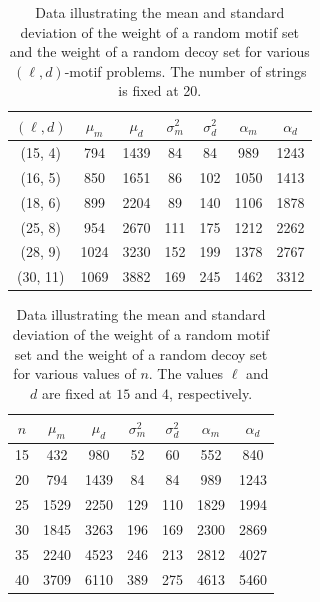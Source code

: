 \begin{table}[h!]
  \begin{center}
	\begin{tabular}{|c|c|c|c|c|c|c|}
\hline	
$(\ell, d)$& $\mu_m$ & $\mu_d$ & $\sigma_m^2$ & $\sigma_d^2$ & $\alpha_m$ & $\alpha_d$ \\
\hline
\hline
(15, 4)	& 794  		& 1439 	& 84    		& 84    		& 989 		& 1243		 \\
(16, 5) 	& 850 		& 1651 	& 86    		& 102  		& 1050 	& 1413		\\
(18, 6) 	& 899 		& 2204 	& 89    		& 140		& 1106 	& 1878 	 \\
(25, 8)	& 954 		& 2670 	& 111   	& 175  		& 1212 	& 2262		\\
(28, 9)	& 1024 	& 3230 	& 152   	& 199 		& 1378		& 2767		\\
(30, 11)& 1069 	& 3882 	& 169   	& 245 		& 1462		& 3312		 \\
	\hline
	\end{tabular} 
\caption[Data illustrating the mean and standard deviation of the weight of a random motif set and the weight of a random decoy set for various $(\ell, d)$-motif problems.]{Data illustrating the mean and standard deviation of the weight of a random motif set and the weight of a random decoy set for various $(\ell, d)$-motif problems.  The number of strings is fixed at 20.}
\label{chapter6:table3}
\end{center}
\end{table}


\begin{table}[h!]
  \begin{center}
	\begin{tabular}{|c|c|c|c|c|c|c|}
\hline	
$n$ & $\mu_m$ & $\mu_d$ & $\sigma_m^2$ & $\sigma_d^2$ & $\alpha_m$ & $\alpha_d$ \\
\hline
\hline
15 	& 432  	& 980 		& 52  		& 60    	& 552   	& 840  \\
20 	& 794  	& 1439 	& 84  		& 84    	& 989  		& 1243	\\
25 	& 1529 & 2250 	& 129 		& 110	& 1829		& 1994 \\
30 	& 1845 & 3263 	& 196 		& 169  	& 2300 	& 2869\\
35 	& 2240 & 4523 	& 246 		& 213   & 2812 	& 4027 \\
40 	& 3709 & 6110 	& 389 		& 275   & 4613  	& 5460 \\
	\hline
	\end{tabular} 
\caption[Data illustrating the mean and standard deviation of the weight of a random motif set and the weight of a random decoy set for various values of $n$.]{Data illustrating the mean and standard deviation of the weight of a random motif set and the weight of a random decoy set  for various values of $n$. The values $\ell$ and $d$ are fixed at $15$ and $4$, respectively.}
\label{chapter6:table4}
\end{center}
\end{table}

